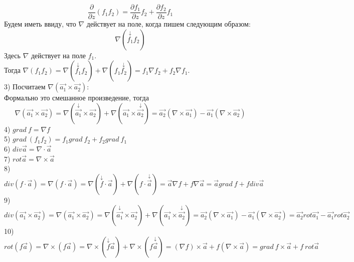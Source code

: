 \documentclass[12pt]{article}
\begin{document}
$$\frac{\partial}{\partial z}(f_1 f_2) = \frac{\partial f_1}{\partial z} f_2 + \frac{\partial f_2}{\partial z} f_1$$
Будем иметь ввиду, что $\nabla$ действует на поле, когда пишем следующим образом:\\
$$\nabla(\overset{\downarrow}{f_1} f_2)$$
Здесь $\nabla$ действует на поле $f_1$.\\
Тогда $\nabla(f_1 f_2) = \nabla(\overset{\downarrow}{f_1} f_2) + \nabla(f_1 \overset{\downarrow}{f_2}) = f_1 {\nabla f_2} + f_2 {\nabla f_1}$.\\
3) Посчитаем $\nabla(\overrightarrow{a_1} \times \overrightarrow{a_2})$:\\
Формально это смешанное произведение, тогда\\
$$\nabla(\overrightarrow{a_1} \times \overrightarrow{a_2}) = \nabla(\overset{\downarrow}{\overrightarrow{a_1}} \times \overrightarrow{a_2}) + \nabla(\overrightarrow{a_1} \times \overset{\downarrow}{\overrightarrow{a_2}}) = \overrightarrow{a_2}(\nabla \times \overrightarrow{a_1})-\overrightarrow{a_1}(\nabla \times \overrightarrow{a_2})$$
4) $grad \ f = {\nabla f}$\\
5) $grad \ (f_1 f_2) = f_1 grad \ f_2 + f_2 grad \ f_1$\\
6) $div \overrightarrow{a} = \nabla \cdot \overrightarrow{a}$\\
7) $rot \overrightarrow{a} = \nabla \times \overrightarrow{a}$\\
8) $div (f \cdot \overrightarrow{a}) = \nabla(f \cdot \overrightarrow{a}) = \nabla(\overset{\downarrow}{f} \cdot \overrightarrow{a}) + \nabla(f \cdot \overset{\downarrow}{\overrightarrow{a}}) =\overrightarrow{a} \nabla f + f \nabla \overrightarrow{a} = \overrightarrow{a} grad \ f + f div \overrightarrow{a}$\\
9) $div (\overrightarrow{a_1} \times \overrightarrow{a_2}) = \nabla(\overrightarrow{a_1} \times \overrightarrow{a_2}) = \nabla(\overset{\downarrow}{\overrightarrow{a_1}} \times \overrightarrow{a_2}) + \nabla(\overrightarrow{a_1} \times \overset{\downarrow}{\overrightarrow{a_2}}) = \overrightarrow{a_2}(\nabla \times \overrightarrow{a_1}) - \overrightarrow{a_1} (\nabla \times \overrightarrow{a_2}) = \overrightarrow{a_2} rot \overrightarrow{a_1} - \overrightarrow{a_1} rot \overrightarrow{a_2}$\\
10) $rot(f\overrightarrow{a}) = \nabla \times (f\overrightarrow{a}) = \nabla \times (\overset{\downarrow}{f}\overrightarrow{a}) + \nabla \times (f\overset{\downarrow}{\overrightarrow{a}}) = ({\nabla f}) \times \overrightarrow{a} + f(\nabla \times \overrightarrow{a})  = grad \ f \times \overrightarrow{a} + f \ rot \overrightarrow{a}$\\
\end{document}

